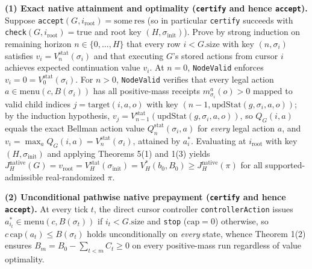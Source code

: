 \documentclass[11pt,a4paper]{article}
\begin{document}
\textbf{(1) Exact native attainment and optimality (\texttt{certify} and
hence \texttt{accept}).} Suppose
\texttt{accept}\((G, i_{\mathrm{root}}) = \mathrm{some\ res}\) (so in
particular \texttt{certify} succeeds with
\texttt{check}\((G, i_{\mathrm{root}}) = \mathrm{true}\) and root key
\((H, \sigma_{\mathrm{init}})\)). Prove by strong induction on remaining
horizon \(n \in \{0, \dots, H\}\) that every row \(i < G.\mathrm{size}\)
with key \((n, \sigma_i)\) satisfies
\(v_i = V_n^{\mathrm{stat}}(\sigma_i)\) and that executing \(G\)'s
stored actions from cursor \(i\) achieves expected continuation value
\(v_i\). At \(n = 0\), \texttt{NodeValid} enforces
\(v_i = 0 = V_0^{\mathrm{stat}}(\sigma_i)\). For \(n > 0\),
\texttt{NodeValid} verifies that every legal action
\(a \in \mathrm{menu}(c, B(\sigma_i))\) has all positive-mass receipts
\(m_{\sigma_i}^a(o) > 0\) mapped to valid child indices
\(j = \mathrm{target}(i,a,o)\) with key
\((n-1, \mathrm{updStat}(g, \sigma_i, a, o))\); by the induction
hypothesis,
\(v_j = V_{n-1}^{\mathrm{stat}}(\mathrm{updStat}(g, \sigma_i, a, o))\),
so \(Q_G(i, a)\) equals the exact Bellman action value
\(Q_n^{\mathrm{stat}}(\sigma_i, a)\) for \emph{every} legal action
\(a\), and \(v_i = \max_a Q_G(i,a) = V_n^{\mathrm{stat}}(\sigma_i)\),
attained by \(a_i^*\). Evaluating at \(i_{\mathrm{root}}\) with key
\((H, \sigma_{\mathrm{init}})\) and applying Theorems 5(1) and 1(3)
yields
\(J_H^{\mathrm{native}}(G) = v_{\mathrm{root}} = V_H^{\mathrm{stat}}(\sigma_{\mathrm{init}}) = V_H^*(b_0, B_0) \ge J_H^{\mathrm{native}}(\pi)\)
for all supported-admissible real-randomized \(\pi\).

\textbf{(2) Unconditional pathwise native prepayment (\texttt{certify}
and hence \texttt{accept}).} At every tick \(t\), the direct cursor
controller \texttt{controllerAction} issues
\(a_{i_t}^* \in \mathrm{menu}(c, B(\sigma_t))\) if
\(i_t < G.\mathrm{size}\) and \texttt{stop} (\(\mathrm{cap} = 0\))
otherwise, so \(c\,\mathrm{cap}(a_t) \le B(\sigma_t)\) holds
unconditionally on \emph{every} state, whence Theorem 1(2) ensures
\(B_m = B_0 - \sum_{t<m} C_t \ge 0\) on every positive-mass run
regardless of value optimality.
\end{document}
